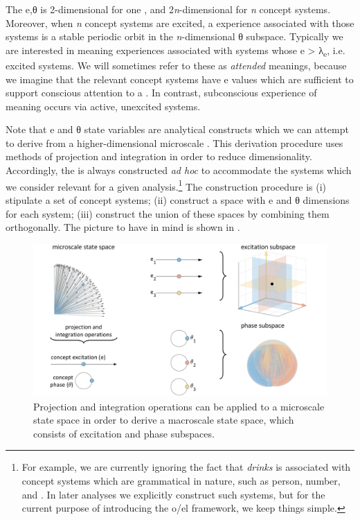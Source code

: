   The e,θ  is 2-dimensional for one , and 2\textit{n}{}-dimensional for \textit{n} concept systems. Moreover, when \textit{n} concept systems are excited, a  experience associated with those systems is a stable periodic orbit in the \textit{n}{}-dimensional θ subspace. Typically we are interested in meaning experiences associated with systems whose e > λ\textsubscript{e}, i.e. excited systems. We will sometimes refer to these as \textit{attended} meanings, because we imagine that the relevant concept systems have e values which are sufficient to support conscious attention to a . In contrast, subconscious experience of meaning occurs via active, unexcited systems.

  Note that e and θ state variables are analytical constructs which we can attempt to derive from a higher-dimensional microscale . This derivation procedure uses methods of projection and integration in order to reduce dimensionality. Accordingly, the  is always constructed \textit{ad hoc} to accommodate the systems which we consider relevant for a given analysis.\footnote{For example, we are currently ignoring the fact that \textit{drinks} is associated with concept systems which are grammatical in nature, such as person, number, and . In later analyses we explicitly construct such systems, but for the current purpose of introducing the o/el framework, we keep things simple.} The  construction procedure is (i) stipulate a set of concept systems; (ii) construct a space with e and θ dimensions for each system; (iii) construct the union of these spaces by combining them orthogonally. The picture to have in mind is shown in {}. 

  
\begin{figure}
\includegraphics[width=\textwidth]{figures/Tilsen-img14.png}
\caption{Projection and integration operations can be applied to a microscale state space in order to derive a macroscale state space, which consists of excitation and phase subspaces.}
\label{fig:2:7}
\end{figure}
 

